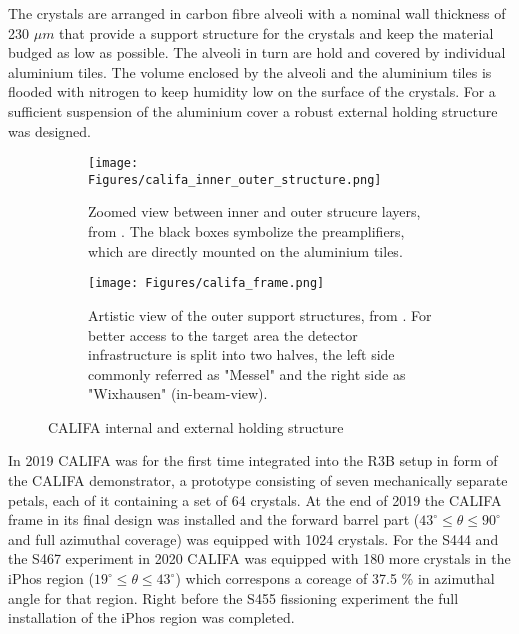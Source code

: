 The crystals are arranged in carbon fibre alveoli with a nominal wall thickness of 230 $\mu m$\cite{tdr:barrel} that provide a support structure for the crystals and keep the material budged as low as possible. The alveoli in turn are hold and covered by individual aluminium tiles. The volume enclosed by the alveoli and the aluminium tiles is flooded with nitrogen to keep humidity low on the surface of the crystals. For a sufficient suspension of the aluminium cover a robust external holding structure was designed.\newline
\begin{figure}
     \centering
     \begin{subfigure}[b]{0.4\textwidth}
         \centering
         \texttt{[image: Figures/califa\_inner\_outer\_structure.png]}
         \caption{Zoomed view between inner and outer strucure layers, from \cite{tdr:barrel}. The black boxes symbolize the preamplifiers, which are directly mounted on the aluminium tiles.}
         \label{fig:califa_frame_zoom}
     \end{subfigure}
     \hfill
     \begin{subfigure}[b]{0.4\textwidth}
         \centering
         \texttt{[image: Figures/califa\_frame.png]}
         \caption{Artistic view of the outer support structures, from \cite{tdr:endcap}. For better access to the target area the detector infrastructure is split into two halves, the left side commonly referred as "Messel" and the right side as "Wixhausen" (in-beam-view).}
         \label{fig:califa_frame}
     \end{subfigure}
     \hfill
        \caption{CALIFA internal and external holding structure}
        \label{fig:califa_holding_structure}
\end{figure}
In 2019 CALIFA was for the first time integrated into the R3B setup in form of the CALIFA demonstrator, a prototype consisting of seven mechanically separate petals, each of it containing a set of 64 crystals.\newline
At the end of 2019 the CALIFA frame in its final design was installed and the forward barrel part ($43^{\circ} \leq \theta \leq 90^{\circ}$ and full azimuthal coverage) was equipped with 1024 crystals.\newline
For the S444 and the S467 experiment in 2020 CALIFA was equipped with 180 more crystals in the iPhos region ($19^{\circ} \leq \theta \leq 43^{\circ}$) which correspons a coreage of 37.5 \% in azimuthal angle for that region. Right before the S455 fissioning experiment \cite{grana2023fission} the full installation of the iPhos region was completed.\newline
